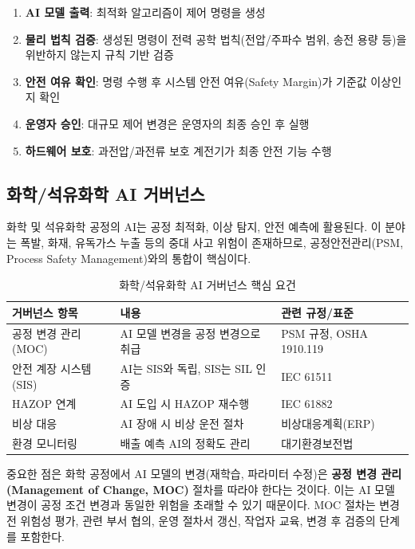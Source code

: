 \begin{enumerate}
    \item \textbf{AI 모델 출력}: 최적화 알고리즘이 제어 명령을 생성
    \item \textbf{물리 법칙 검증}: 생성된 명령이 전력 공학 법칙(전압/주파수 범위, 송전 용량 등)을 위반하지 않는지 규칙 기반 검증
    \item \textbf{안전 여유 확인}: 명령 수행 후 시스템 안전 여유(Safety Margin)가 기준값 이상인지 확인
    \item \textbf{운영자 승인}: 대규모 제어 변경은 운영자의 최종 승인 후 실행
    \item \textbf{하드웨어 보호}: 과전압/과전류 보호 계전기가 최종 안전 기능 수행
\end{enumerate}

\subsection{화학/석유화학 AI 거버넌스}
\label{sec:19.4.4}

화학 및 석유화학 공정의 AI는 공정 최적화, 이상 탐지, 안전 예측에 활용된다. 이 분야는 폭발, 화재, 유독가스 누출 등의 중대 사고 위험이 존재하므로, 공정안전관리(PSM, Process Safety Management)와의 통합이 핵심이다.

\begin{table}[htbp]
\centering
\caption{화학/석유화학 AI 거버넌스 핵심 요건}
\label{tab:19_chemical}
\begin{tabularx}{\textwidth}{p{3cm}Xp{4cm}}
\toprule
\textbf{거버넌스 항목} & \textbf{내용} & \textbf{관련 규정/표준} \\
\midrule
공정 변경 관리(MOC) & AI 모델 변경을 공정 변경으로 취급 & PSM 규정, OSHA 1910.119 \\
안전 계장 시스템(SIS) & AI는 SIS와 독립, SIS는 SIL 인증 & IEC 61511 \\
HAZOP 연계 & AI 도입 시 HAZOP 재수행 & IEC 61882 \\
비상 대응 & AI 장애 시 비상 운전 절차 & 비상대응계획(ERP) \\
환경 모니터링 & 배출 예측 AI의 정확도 관리 & 대기환경보전법 \\
\bottomrule
\end{tabularx}
\end{table}

중요한 점은 화학 공정에서 AI 모델의 변경(재학습, 파라미터 수정)은 \textbf{공정 변경 관리(Management of Change, MOC)} 절차를 따라야 한다는 것이다. 이는 AI 모델 변경이 공정 조건 변경과 동일한 위험을 초래할 수 있기 때문이다. MOC 절차는 변경 전 위험성 평가, 관련 부서 협의, 운영 절차서 갱신, 작업자 교육, 변경 후 검증의 단계를 포함한다.

